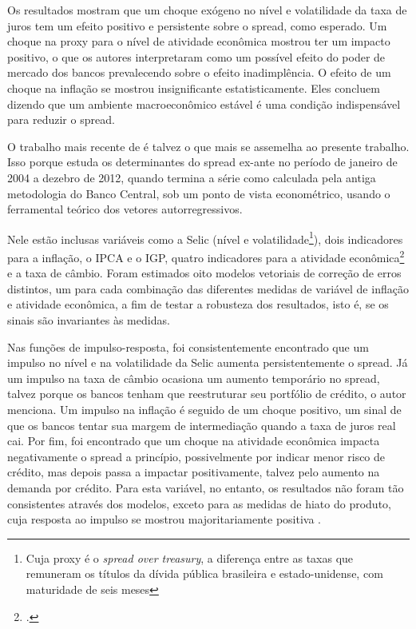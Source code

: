 \documentclass[a4paper,
               article,
               12pt,
               openany,
               oneside,
               english,
               brazil]{abntex2}
\numberwithin{equation}{section}
\begin{document}
    Os resultados mostram que um choque exógeno no nível e volatilidade da taxa de juros tem um efeito positivo e persistente sobre o spread, como esperado. Um choque na proxy para o nível de atividade econômica mostrou ter um impacto positivo, o que os autores interpretaram como um possível efeito do poder de mercado dos bancos prevalecendo sobre o efeito inadimplência. O efeito de um choque na inflação se mostrou insignificante estatisticamente. Eles concluem dizendo que um ambiente macroeconômico estável é uma condição indispensável para reduzir o spread.

    O trabalho mais recente de \textcite{chaim} é talvez o que mais se assemelha ao presente trabalho. Isso porque estuda os determinantes do spread ex-ante no período de janeiro de 2004 a dezebro de 2012, quando termina a série como calculada pela antiga metodologia do Banco Central, sob um ponto de vista econométrico, usando o ferramental teórico dos vetores autorregressivos.

    Nele estão inclusas variáveis como a Selic (nível e volatilidade\footnote{Cuja proxy é o \textit{spread over treasury}, a diferença entre as taxas que remuneram os títulos da dívida pública brasileira e estado-unidense, com maturidade de seis meses}), dois indicadores para a inflação, o IPCA e o IGP, quatro indicadores para a atividade econômica\footcite[20]{chaim} e a taxa de câmbio. Foram estimados oito modelos vetoriais de correção de erros distintos, um para cada combinação das diferentes medidas de variável de inflação e atividade econômica, a fim de testar a robusteza dos resultados, isto é, se os sinais são invariantes às medidas. 

    Nas funções de impulso-resposta, foi consistentemente encontrado que um impulso no nível e na volatilidade da Selic aumenta persistentemente o spread. Já um impulso na taxa de câmbio ocasiona um aumento temporário no spread, talvez porque os bancos tenham que reestruturar seu portfólio de crédito, o autor menciona. Um impulso na inflação é seguido de um choque positivo, um sinal de que os bancos tentar sua margem de intermediação quando a taxa de juros real cai. Por fim, foi encontrado que um choque na atividade econômica impacta negativamente o spread a princípio, possivelmente por indicar menor risco de crédito, mas depois passa a impactar positivamente, talvez pelo aumento na demanda por crédito. Para esta variável, no entanto, os resultados não foram tão consistentes através dos modelos, exceto para as medidas de hiato do produto, cuja resposta ao impulso se mostrou majoritariamente positiva \cite[32-38]{chaim}.
\end{document}

